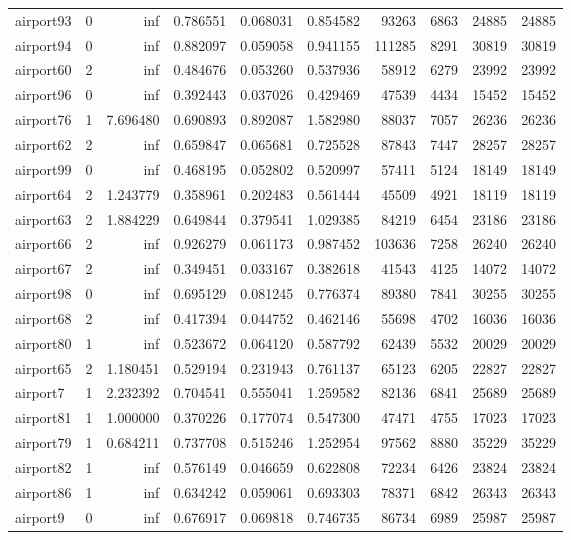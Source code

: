 \documentclass[../../../thesis.tex]{subfiles}
\begin{document}
\begin{longtable}{|l|r|r|r|r|r|r|r|r|r|}
airport93 & 0 & inf & 0.786551 & 0.068031 & 0.854582 & 93263 & 6863 & 24885 & 24885 \\
airport94 & 0 & inf & 0.882097 & 0.059058 & 0.941155 & 111285 & 8291 & 30819 & 30819 \\
airport60 & 2 & inf & 0.484676 & 0.053260 & 0.537936 & 58912 & 6279 & 23992 & 23992 \\
airport96 & 0 & inf & 0.392443 & 0.037026 & 0.429469 & 47539 & 4434 & 15452 & 15452 \\
airport76 & 1 & 7.696480 & 0.690893 & 0.892087 & 1.582980 & 88037 & 7057 & 26236 & 26236 \\
airport62 & 2 & inf & 0.659847 & 0.065681 & 0.725528 & 87843 & 7447 & 28257 & 28257 \\
airport99 & 0 & inf & 0.468195 & 0.052802 & 0.520997 & 57411 & 5124 & 18149 & 18149 \\
airport64 & 2 & 1.243779 & 0.358961 & 0.202483 & 0.561444 & 45509 & 4921 & 18119 & 18119 \\
airport63 & 2 & 1.884229 & 0.649844 & 0.379541 & 1.029385 & 84219 & 6454 & 23186 & 23186 \\
airport66 & 2 & inf & 0.926279 & 0.061173 & 0.987452 & 103636 & 7258 & 26240 & 26240 \\
airport67 & 2 & inf & 0.349451 & 0.033167 & 0.382618 & 41543 & 4125 & 14072 & 14072 \\
airport98 & 0 & inf & 0.695129 & 0.081245 & 0.776374 & 89380 & 7841 & 30255 & 30255 \\
airport68 & 2 & inf & 0.417394 & 0.044752 & 0.462146 & 55698 & 4702 & 16036 & 16036 \\
airport80 & 1 & inf & 0.523672 & 0.064120 & 0.587792 & 62439 & 5532 & 20029 & 20029 \\
airport65 & 2 & 1.180451 & 0.529194 & 0.231943 & 0.761137 & 65123 & 6205 & 22827 & 22827 \\
airport7 & 1 & 2.232392 & 0.704541 & 0.555041 & 1.259582 & 82136 & 6841 & 25689 & 25689 \\
airport81 & 1 & 1.000000 & 0.370226 & 0.177074 & 0.547300 & 47471 & 4755 & 17023 & 17023 \\
airport79 & 1 & 0.684211 & 0.737708 & 0.515246 & 1.252954 & 97562 & 8880 & 35229 & 35229 \\
airport82 & 1 & inf & 0.576149 & 0.046659 & 0.622808 & 72234 & 6426 & 23824 & 23824 \\
airport86 & 1 & inf & 0.634242 & 0.059061 & 0.693303 & 78371 & 6842 & 26343 & 26343 \\
airport9 & 0 & inf & 0.676917 & 0.069818 & 0.746735 & 86734 & 6989 & 25987 & 25987 \\

\end{longtable}
\end{document}
